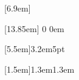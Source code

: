 \documentclass[12pt]{report}			%
\newif\ifallchapters
\begin{document}
	\contentsmargin[2em]{2em}
	
		[6.9em]		%
		{}
		{}
		{}
		{\contentspage}	%
	
		[13.85em]	%
		{}		%
		{0}		%
		{0em}	%
	
	[5.5em]{}{3.2em}{5pt}
	
	\renewcommand{\emph}[1]{\uline{#1}}
	
	\renewcommand{\APACciteatitle}[1]{\enquote{#1}}
	
	\setlength\parindent{3em}
	
	\setlength{\textfloatsep}{0.5em} 
\else
	\renewcommand{\emph}[1]{\textbf{#1}}
\fi

\ifallchapters
\addtocontents{toc}{~\hfill{Page}\par}

\ifDissertationFormat
	\addtocontents{lof}{\hspace{-2.8em}Figure No.~\hfill{Page}\par}
	\addtocontents{lot}{\hspace{-2.8em}Table No.~\hfill{Page}\par}
\else
\fi

\ifDissertationFormat
	[1.5em]{}{1.3em}{1.3em}
\fi
\end{document}
